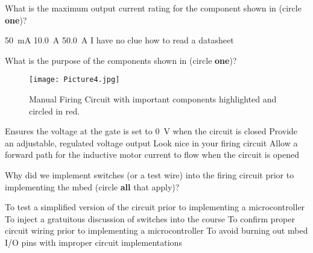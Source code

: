 \documentclass[addpoints,answers]{exam}
\begin{document}
\begin{questions}
\clearpage
\question
What is the maximum output current rating for the component shown in  (circle {\bf one})?
\begin{choices}
\choice \SI{50}{\milli\ampere}
\choice \SI{10.0}{\ampere}
\CorrectChoice \SI{50.0}{\ampere}
\choice I have no clue how to read a datasheet
\end{choices}






\question
What is the purpose of the components shown in  (circle {\bf one})?
\begin{figure}[h]
\centering
	\texttt{[image: Picture4.jpg]}
	\caption{Manual Firing Circuit with important components highlighted and circled in red.}
	\label{fig:pulldown}
\end{figure}
\begin{choices}
\choice Ensures the voltage at the gate is set to \SI{0}{\volt} when the circuit is closed
\choice Provide an adjustable, regulated voltage output  
\choice Look nice in your firing circuit
\CorrectChoice Allow a forward path for the inductive motor current to flow when the circuit is opened
\end{choices}












\question
Why did we implement switches (or a test wire) into the firing circuit prior to implementing the mbed (circle {\bf all} that apply)?
\begin{choices}
\CorrectChoice To test a simplified version of the circuit prior to implementing a microcontroller
\choice To inject a gratuitous discussion of switches into the course
\CorrectChoice To confirm proper circuit wiring prior to implementing a microcontroller
\CorrectChoice To avoid burning out mbed I/O pins with improper circuit implementations
\end{choices}






\end{questions}
\end{document}
